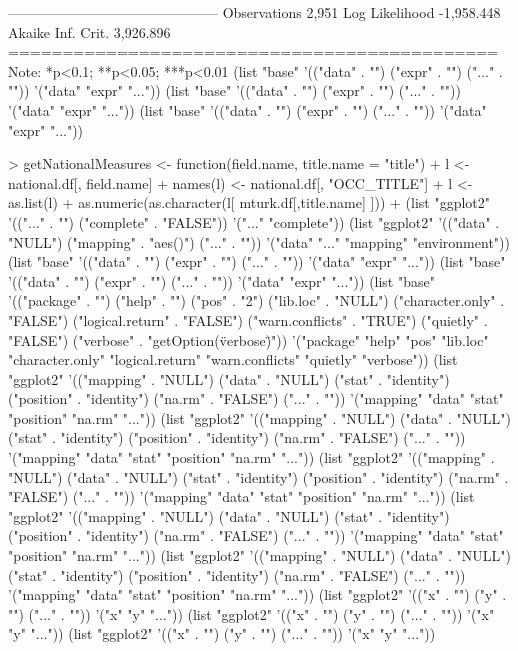 ---------------------------------------------
Observations                 2,951           
Log Likelihood            -1,958.448         
Akaike Inf. Crit.          3,926.896         
=============================================
Note:             *p<0.1; **p<0.05; ***p<0.01
(list "base" '(("data" . "") ("expr" . "") ("..." . "")) '("data" "expr" "..."))
(list "base" '(("data" . "") ("expr" . "") ("..." . "")) '("data" "expr" "..."))
(list "base" '(("data" . "") ("expr" . "") ("..." . "")) '("data" "expr" "..."))

> getNationalMeasures <- function(field.name, title.name = "title"){
+   l <- national.df[, field.name]
+   names(l) <- national.df[, "OCC_TITLE"]
+   l <- as.list(l)
+   as.numeric(as.character(l[ mturk.df[,title.name] ]))
+ }
(list "ggplot2" '(("..." . "") ("complete" . "FALSE")) '("..." "complete"))
(list "ggplot2" '(("data" . "NULL") ("mapping" . "aes()") ("..." . "")) '("data" "..." "mapping" "environment"))
(list "base" '(("data" . "") ("expr" . "") ("..." . "")) '("data" "expr" "..."))
(list "base" '(("data" . "") ("expr" . "") ("..." . "")) '("data" "expr" "..."))
(list "base" '(("package" . "") ("help" . "") ("pos" . "2") ("lib.loc" . "NULL") ("character.only" . "FALSE") ("logical.return" . "FALSE") ("warn.conflicts" . "TRUE") ("quietly" . "FALSE") ("verbose" . "getOption(\"verbose\")")) '("package" "help" "pos" "lib.loc" "character.only" "logical.return" "warn.conflicts" "quietly" "verbose"))
(list "ggplot2" '(("mapping" . "NULL") ("data" . "NULL") ("stat" . "identity") ("position" . "identity") ("na.rm" . "FALSE") ("..." . "")) '("mapping" "data" "stat" "position" "na.rm" "..."))
(list "ggplot2" '(("mapping" . "NULL") ("data" . "NULL") ("stat" . "identity") ("position" . "identity") ("na.rm" . "FALSE") ("..." . "")) '("mapping" "data" "stat" "position" "na.rm" "..."))
(list "ggplot2" '(("mapping" . "NULL") ("data" . "NULL") ("stat" . "identity") ("position" . "identity") ("na.rm" . "FALSE") ("..." . "")) '("mapping" "data" "stat" "position" "na.rm" "..."))
(list "ggplot2" '(("mapping" . "NULL") ("data" . "NULL") ("stat" . "identity") ("position" . "identity") ("na.rm" . "FALSE") ("..." . "")) '("mapping" "data" "stat" "position" "na.rm" "..."))
(list "ggplot2" '(("mapping" . "NULL") ("data" . "NULL") ("stat" . "identity") ("position" . "identity") ("na.rm" . "FALSE") ("..." . "")) '("mapping" "data" "stat" "position" "na.rm" "..."))
(list "ggplot2" '(("x" . "") ("y" . "") ("..." . "")) '("x" "y" "..."))
(list "ggplot2" '(("x" . "") ("y" . "") ("..." . "")) '("x" "y" "..."))
(list "ggplot2" '(("x" . "") ("y" . "") ("..." . "")) '("x" "y" "..."))
